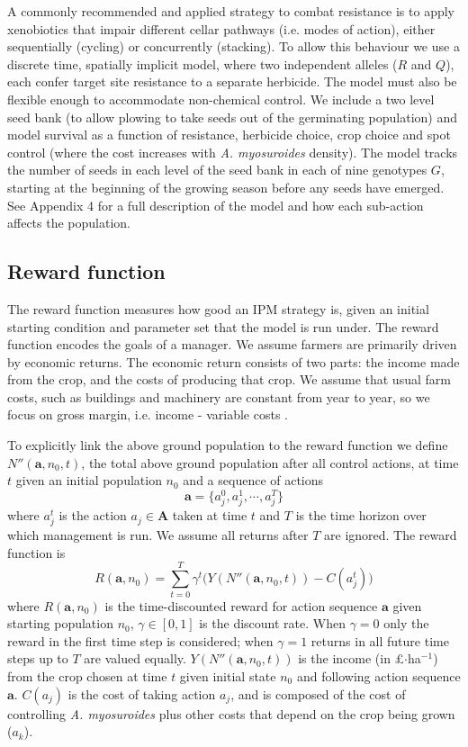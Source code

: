\documentclass[12pt, a4paper]{article}
\begin{document}
A commonly recommended \citep{REX2013} and applied \citep{Hick2018} strategy to combat resistance is to apply xenobiotics that impair different cellar pathways (i.e. modes of action), either sequentially (cycling) or concurrently (stacking). To allow this behaviour we use a discrete time, spatially implicit model, where two independent alleles ($R$ and $Q$), each confer target site resistance to a separate herbicide. The model must also be flexible enough to accommodate non-chemical control. We include a two level seed bank (to allow plowing to take seeds out of the germinating population) and model survival as a function of resistance, herbicide choice, crop choice and spot control (where the cost increases with \textit{A. myosuroides} density). The model tracks the number of seeds in each level of the seed bank in each of nine genotypes $G$, starting at the beginning of the growing season before any seeds have emerged. See Appendix 4 for a full description of the model and how each sub-action affects the population. 

\subsection*{Reward function}
The reward function measures how good an IPM strategy is, given an initial starting condition and parameter set that the model is run under. The reward function encodes the goals of a manager. We assume farmers are primarily driven by economic returns. The economic return consists of two parts: the income made from the crop, and the costs of producing that crop. We assume that usual farm costs, such as buildings and machinery are constant from year to year, so we focus on gross margin, i.e. income - variable costs \citep[pp.~3--4]{Nix2016}. 

To explicitly link the above ground population to the reward function we define $N''(\mathbf{a}, n_0, t)$, the total above ground population after all control actions, at time $t$ given an initial population $n_0$ and a sequence of actions 
\begin{equation}
	\mathbf{a} = \{a_j^0, a_j^1, \cdots, a_j^T\}
\end{equation}	  
where $a_j^t$ is the action $a_j \in \mathbf{A}$ taken at time $t$ and $T$ is the time horizon over which management is run. We assume all returns after $T$ are ignored. The reward function is  
\begin{equation}
	R(\mathbf{a}, n_0) = \sum_{t=0}^T \gamma^t \Big( Y(N''(\mathbf{a}, n_0, t)) - C(a_j^t) \Big)
\end{equation}
where $R(\mathbf{a}, n_0)$ is the time-discounted reward for action sequence $\mathbf{a}$ given starting population $n_0$, $\gamma \in [0, 1]$ is the discount rate. When $\gamma = 0$ only the reward in the first time step is considered; when $\gamma = 1$ returns in all future time steps up to $T$ are valued equally. $Y(N''(\mathbf{a}, n_0, t))$ is the income (in \pounds$\cdot$ha$^{-1}$) from the crop chosen at time $t$ given initial state $n_0$ and following action sequence $\mathbf{a}$. $C(a_j)$ is the cost of taking action $a_j$, and is composed of the cost of controlling \textit{A. myosuroides} plus other costs that depend on the crop being grown ($a_k$).   
\end{document}

